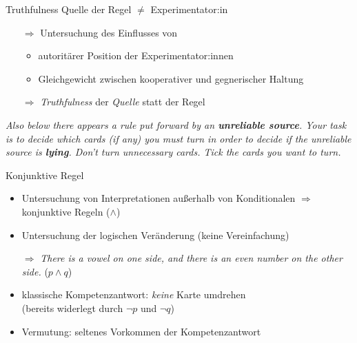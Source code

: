 \begin{frame}{Truthfulness {\scriptsize \cite[S.~97-98]{stenningHumanReasoningCognitive2008}}}
    Quelle der Regel $\ne$ Experimentator:in

    \begin{itemize}
        \item[$\Rightarrow$] Untersuchung des Einflusses von
        \begin{itemize}
            \item autoritärer Position der Experimentator:innen
            \item Gleichgewicht zwischen kooperativer und gegnerischer Haltung
        \end{itemize}

        \item[$\Rightarrow$] \emph{Truthfulness} der \emph{Quelle} statt der Regel
    \end{itemize}

    \emph{ \small
        Also below there appears a rule {\normalsize \alert{put forward by an \textbf{unreliable source}}}.
        Your task is to decide which cards (if any) you must turn in order to decide {\normalsize \alert{if the unreliable source is \textbf{lying}}}.
        Don't turn unnecessary cards. Tick the cards you want to turn.
    }
\end{frame}


\begin{frame}{Konjunktive Regel {\scriptsize \cite[S.~99]{stenningHumanReasoningCognitive2008}}}
    \begin{itemize}
        \item Untersuchung von Interpretationen außerhalb von Konditionalen
            $\Rightarrow$ konjunktive Regeln ($\land$)
        
        \item Untersuchung der logischen Veränderung (keine Vereinfachung)
        
        \item[$\Rightarrow$] \emph{There is a vowel on one side, \alert{and} there is an even number on the other side.} ($p \land q$)
        
        \item klassische Kompetenzantwort: \emph{keine} Karte umdrehen \\
            {\footnotesize (bereits widerlegt durch $\lnot p$ und $\lnot q$)}
        
        \item Vermutung: seltenes Vorkommen der Kompetenzantwort
    \end{itemize}
\end{frame}


